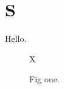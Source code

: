 \documentclass{paper}
\begin{document}
\section{S}
Hello.
\begin{figure}[h]X\caption{Fig one.}\end{figure}
\end{document}
